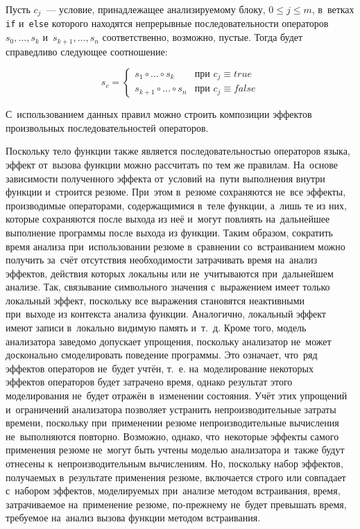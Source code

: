 Пусть $c_j$~--- условие, принадлежащее анализируемому блоку, $0 \leqslant j \leqslant m$, в~ветках \texttt{if} и~\texttt{else} которого находятся непрерывные последовательности операторов $s_0, \ldots, s_k$ и~$s_{k+1}, \ldots, s_n$ соответственно, возможно, пустые. Тогда будет справедливо следующее соотношение:

\begin{equation}
    s_c  =
     \left\{
    \begin{matrix}
    s_1 \circ \ldots \circ s_k & \text{при } c_j \equiv true \\
    s_{k+1} \circ \ldots \circ s_n & \text{при } c_j \equiv false
    \end{matrix} \right.
\end{equation}

С~использованием данных правил можно строить композиции эффектов произвольных последовательностей операторов.

Поскольку тело функции также является последовательностью операторов языка, эффект от~вызова функции можно рассчитать по тем же правилам. На~основе зависимости полученного эффекта от~условий на~пути выполнения внутри функции и~строится резюме. При~этом в~резюме сохраняются не~все эффекты, производимые операторами, содержащимися в~теле функции, а~лишь те из них, которые сохраняются после выхода из неё и~могут повлиять на~дальнейшее выполнение программы после выхода из функции. Таким образом, сократить время анализа при~использовании резюме в~сравнении со~встраиванием можно получить за~счёт отсутствия необходимости затрачивать время на~анализ эффектов, действия которых локальны или не~учитываются при~дальнейшем анализе. Так, связывание символьного значения с~выражением имеет только локальный эффект, поскольку все выражения становятся неактивными при~выходе из контекста анализа функции. Аналогично, локальный эффект имеют записи в~локально видимую память и~т.~д. Кроме того, модель анализатора заведомо допускает упрощения, поскольку анализатор не~может досконально смоделировать поведение программы. Это означает, что~ряд эффектов операторов не~будет учтён, т.~е. на~моделирование некоторых эффектов операторов будет затрачено время, однако результат этого моделирования не~будет отражён в~изменении состояния. Учёт этих упрощений и~ограничений анализатора позволяет устранить непроизводительные затраты времени, поскольку при~применении резюме непроизводительные вычисления не~выполняются повторно. Возможно, однако, что~некоторые эффекты самого применения резюме не~могут быть учтены моделью анализатора и~также будут отнесены к~непроизводительным вычислениям. Но, поскольку набор эффектов, получаемых в~результате применения резюме, включается строго или совпадает с~набором эффектов, моделируемых при~анализе методом встраивания, время, затрачиваемое на~применение резюме, по-прежнему не~будет превышать время, требуемое на~анализ вызова функции методом встраивания.



